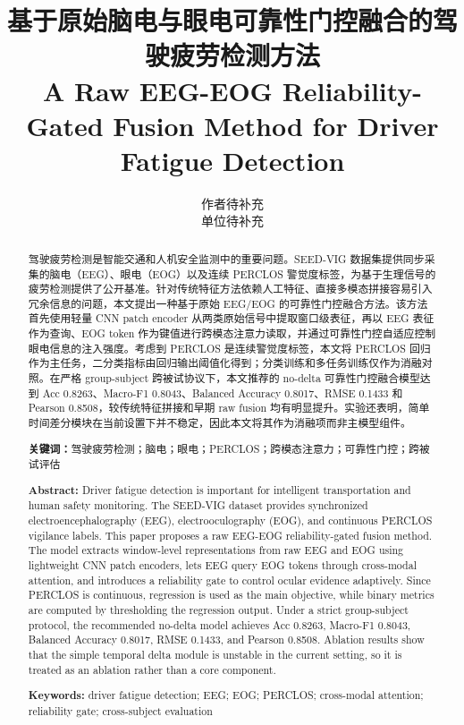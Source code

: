 \documentclass[UTF8,a4paper,11pt,fontset=windows]{ctexart}
\title{基于原始脑电与眼电可靠性门控融合的驾驶疲劳检测方法\\[3pt]
\large A Raw EEG-EOG Reliability-Gated Fusion Method for Driver Fatigue Detection}
\author{作者待补充\\单位待补充}
\date{}
\begin{document}
\maketitle

\begin{abstract}
驾驶疲劳检测是智能交通和人机安全监测中的重要问题。SEED-VIG 数据集提供同步采集的脑电（EEG）、眼电（EOG）以及连续 PERCLOS 警觉度标签，为基于生理信号的疲劳检测提供了公开基准。针对传统特征方法依赖人工特征、直接多模态拼接容易引入冗余信息的问题，本文提出一种基于原始 EEG/EOG 的可靠性门控融合方法。该方法首先使用轻量 CNN patch encoder 从两类原始信号中提取窗口级表征，再以 EEG 表征作为查询、EOG token 作为键值进行跨模态注意力读取，并通过可靠性门控自适应控制眼电信息的注入强度。考虑到 PERCLOS 是连续警觉度标签，本文将 PERCLOS 回归作为主任务，二分类指标由回归输出阈值化得到；分类训练和多任务训练仅作为消融对照。在严格 group-subject 跨被试协议下，本文推荐的 no-delta 可靠性门控融合模型达到 Acc 0.8263、Macro-F1 0.8043、Balanced Accuracy 0.8017、RMSE 0.1433 和 Pearson 0.8508，较传统特征拼接和早期 raw fusion 均有明显提升。实验还表明，简单时间差分模块在当前设置下并不稳定，因此本文将其作为消融项而非主模型组件。

\noindent\textbf{关键词：}驾驶疲劳检测；脑电；眼电；PERCLOS；跨模态注意力；可靠性门控；跨被试评估
\end{abstract}

\begin{abstract}
\noindent\textbf{Abstract:} Driver fatigue detection is important for intelligent transportation and human safety monitoring. The SEED-VIG dataset provides synchronized electroencephalography (EEG), electrooculography (EOG), and continuous PERCLOS vigilance labels. This paper proposes a raw EEG-EOG reliability-gated fusion method. The model extracts window-level representations from raw EEG and EOG using lightweight CNN patch encoders, lets EEG query EOG tokens through cross-modal attention, and introduces a reliability gate to control ocular evidence adaptively. Since PERCLOS is continuous, regression is used as the main objective, while binary metrics are computed by thresholding the regression output. Under a strict group-subject protocol, the recommended no-delta model achieves Acc 0.8263, Macro-F1 0.8043, Balanced Accuracy 0.8017, RMSE 0.1433, and Pearson 0.8508. Ablation results show that the simple temporal delta module is unstable in the current setting, so it is treated as an ablation rather than a core component.

\noindent\textbf{Keywords:} driver fatigue detection; EEG; EOG; PERCLOS; cross-modal attention; reliability gate; cross-subject evaluation
\end{abstract}
\end{document}
